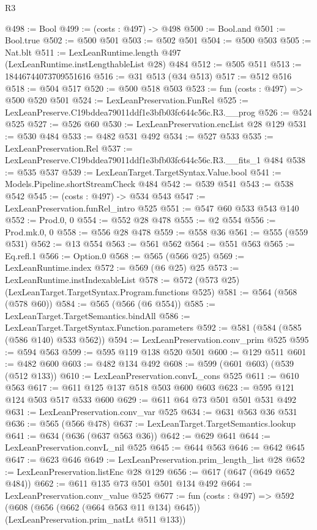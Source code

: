 \begin{lexlean}{R3}
\begin{coremodule}
@498 := Bool
@499 := (costs : @497) -> @498
@500 := Bool.and
@501 := Bool.true
@502 := @500 @501
@503 := @502 @501
@504 := @500 @503
@505 := Nat.blt
@511 := LexLeanRuntime.length @497 (LexLeanRuntime.instLengthableList @28) @484
@512 := @505 @511
@513 := 18446744073709551616
@516 := @31 @513 (@34 @513)
@517 := @512 @516
@518 := @504 @517
@520 := @500 @518 @503
@523 := fun (costs : @497) => @500 @520 @501
@524 := LexLeanPreservation.FunRel
@525 := LexLeanPreserve.C19bddea79011ddf1e3bfb03fc644c56c.R3.__prog
@526 := @524 @525
@527 := @526 @60
@530 := LexLeanPreservation.encList @28 @129
@531 := @530 @484
@533 := @482 @531 @492
@534 := @527 @533
@535 := LexLeanPreservation.Rel
@537 := LexLeanPreserve.C19bddea79011ddf1e3bfb03fc644c56c.R3.__fits_1 @484
@538 := @535 @537
@539 := LexLeanTarget.TargetSyntax.Value.bool
@541 := Models.Pipeline.shortStreamCheck @484
@542 := @539 @541
@543 := @538 @542
@545 := (costs : @497) -> @534 @543
@547 := LexLeanPreservation.funRel_intro @525
@551 := @547 @60 @533 @543 @140
@552 := Prod.{0, 0}
@554 := @552 @28 @478
@555 := @2 @554
@556 := Prod.mk.{0, 0}
@558 := @556 @28 @478
@559 := @558 @36
@561 := @555 (@559 @531)
@562 := @13 @554
@563 := @561 @562
@564 := @551 @563
@565 := Eq.refl.{1}
@566 := Option.{0}
@568 := @565 (@566 @25)
@569 := LexLeanRuntime.index
@572 := @569 (@6 @25) @25
@573 := LexLeanRuntime.instIndexableList
@578 := @572 (@573 @25) (LexLeanTarget.TargetSyntax.Program.functions @525)
@581 := @564 (@568 (@578 @60))
@584 := @565 (@566 (@6 @554))
@585 := LexLeanTarget.TargetSemantics.bindAll
@586 := LexLeanTarget.TargetSyntax.Function.parameters
@592 := @581 (@584 (@585 (@586 @140) @533 @562))
@594 := LexLeanPreservation.conv_prim @525
@595 := @594 @563
@599 := @595 @119 @138 @520 @501
@600 := @129 @511
@601 := @482 @600
@603 := @482 @134 @492
@608 := @599 (@601 @603) (@539 (@512 @133))
@610 := LexLeanPreservation.convL_cons @525
@611 := @610 @563
@617 := @611 @125 @137 @518 @503 @600 @603
@623 := @595 @121 @124 @503 @517 @533 @600
@629 := @611 @64 @73 @501 @501 @531 @492
@631 := LexLeanPreservation.conv_var @525
@634 := @631 @563 @36 @531
@636 := @565 (@566 @478)
@637 := LexLeanTarget.TargetSemantics.lookup
@641 := @634 (@636 (@637 @563 @36))
@642 := @629 @641
@644 := LexLeanPreservation.convL_nil @525
@645 := @644 @563
@646 := @642 @645
@647 := @623 @646
@649 := LexLeanPreservation.prim_length_list @28
@652 := LexLeanPreservation.listEnc @28 @129
@656 := @617 (@647 (@649 @652 @484))
@662 := @611 @135 @73 @501 @501 @134 @492
@664 := LexLeanPreservation.conv_value @525
@677 := fun (costs : @497) =>
  @592 (@608 (@656 (@662 (@664 @563 @11 @134) @645)) (LexLeanPreservation.prim_natLt @511 @133))

\end{coremodule}
\end{lexlean}
